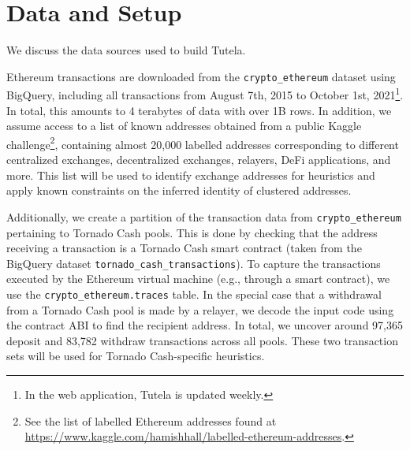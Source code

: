 \section{Data and Setup}
\label{sec:data}

We discuss the data sources used to build Tutela.

Ethereum transactions are downloaded from the \texttt{crypto\_ethereum} dataset using BigQuery, including all transactions from August 7th, 2015 to October 1st, 2021\footnote{In the web application, Tutela is updated weekly.}.  In total, this amounts to 4 terabytes of data with over 1B rows.
In addition, we assume access to a list of known addresses obtained from a public Kaggle challenge\footnote{See the list of labelled Ethereum addresses found at \url{https://www.kaggle.com/hamishhall/labelled-ethereum-addresses}.}, containing almost 20,000 labelled addresses corresponding to different centralized exchanges, decentralized exchanges, relayers, DeFi applications, and more.
This list will be used to identify exchange addresses for heuristics and apply known constraints on the inferred identity of clustered addresses.

Additionally, we create a partition of the transaction data from \texttt{crypto\_ethereum} pertaining to Tornado Cash pools. This is done by checking that the address receiving a transaction is a Tornado Cash smart contract (taken from the BigQuery dataset \texttt{tornado\_cash\_transactions}). To capture the transactions executed by the Ethereum virtual machine (e.g., through a smart contract), we use the \texttt{crypto\_ethereum.traces} table. In the special case that a withdrawal from a Tornado Cash pool is made by a relayer, we decode the input code using the contract ABI to find the recipient address. In total, we uncover around 97,365 deposit and 83,782 withdraw transactions across all pools. These two transaction sets will be used for Tornado Cash-specific heuristics.